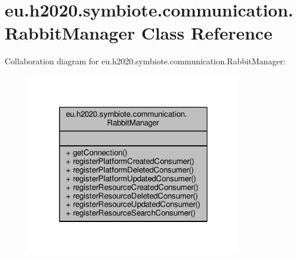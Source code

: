\hypertarget{classeu_1_1h2020_1_1symbiote_1_1communication_1_1RabbitManager}{}\section{eu.\+h2020.\+symbiote.\+communication.\+Rabbit\+Manager Class Reference}
\label{classeu_1_1h2020_1_1symbiote_1_1communication_1_1RabbitManager}


Collaboration diagram for eu.\+h2020.\+symbiote.\+communication.\+Rabbit\+Manager\+:
\nopagebreak
\begin{figure}[H]
\begin{center}
\leavevmode
\includegraphics[width=268pt]{classeu_1_1h2020_1_1symbiote_1_1communication_1_1RabbitManager__coll__graph}
\end{center}
\end{figure}

